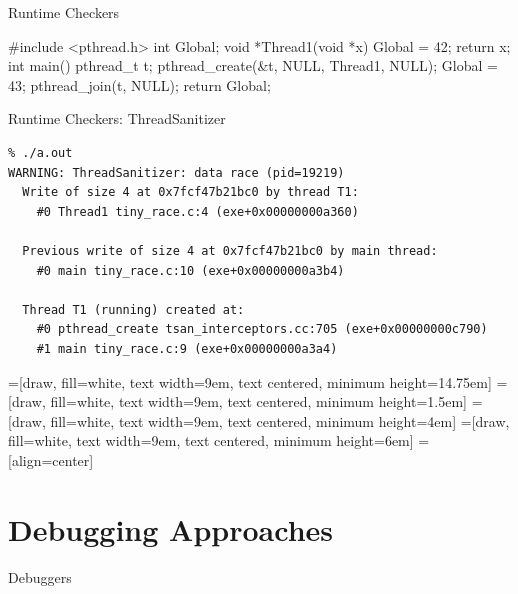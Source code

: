 \documentclass[11pt,aspectratio=169]{beamer}
\begin{document}
\begin{slide}{Runtime Checkers}
\begin{ccode}
#include <pthread.h>
int Global;
void *Thread1(void *x) {
  Global = 42;
  return x;
}
int main() {
  pthread_t t;
  pthread_create(&t, NULL, Thread1, NULL);
  Global = 43;
  pthread_join(t, NULL);
  return Global;
}
\end{ccode}
\end{slide}
\begin{slide}{Runtime Checkers: ThreadSanitizer}
\begin{verbatim}
% ./a.out
WARNING: ThreadSanitizer: data race (pid=19219)
  Write of size 4 at 0x7fcf47b21bc0 by thread T1:
    #0 Thread1 tiny_race.c:4 (exe+0x00000000a360)

  Previous write of size 4 at 0x7fcf47b21bc0 by main thread:
    #0 main tiny_race.c:10 (exe+0x00000000a3b4)

  Thread T1 (running) created at:
    #0 pthread_create tsan_interceptors.cc:705 (exe+0x00000000c790)
    #1 main tiny_race.c:9 (exe+0x00000000a3a4)
\end{verbatim}
\end{slide}


=[draw, fill=white, text width=9em, text centered, minimum 
height=14.75em]
=[draw, fill=white, text width=9em, text centered, minimum 
height=1.5em]
=[draw, fill=white, text width=9em, text centered, minimum 
height=4em]
=[draw, fill=white, text width=9em, text centered, minimum 
height=6em]
=[align=center]

\section{Debugging Approaches}

\begin{frame}{Debuggers}
\end{frame}
\end{document}
